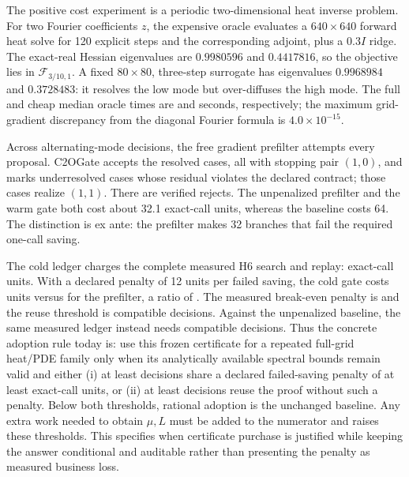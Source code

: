 \documentclass[smallextended]{svjour3}
\newcommand{\cF}{\mathcal{F}}
\begin{document}
The positive cost experiment is a periodic two-dimensional heat inverse
problem.  For two Fourier coefficients $z$, the expensive oracle evaluates a
$640\times640$ forward heat solve for 120 explicit steps and the corresponding
adjoint, plus a $0.3I$ ridge.  The exact-real Hessian eigenvalues are
$0.9980596$ and $0.4417816$, so the objective lies in
$\cF_{3/10,1}$.  A fixed $80\times80$, three-step surrogate has eigenvalues
$0.9968984$ and $0.3728483$: it resolves the low mode but over-diffuses the
high mode.  The full and cheap median oracle times are
\HeatExactMedianSeconds{} and \HeatCheapMedianSeconds{} seconds, respectively;
the maximum grid-gradient discrepancy from the diagonal Fourier formula is
$4.0\times10^{-15}$.

Across \HeatEpisodes{} alternating-mode decisions, the free gradient prefilter
attempts every proposal.  C2OGate accepts the \HeatAccepted{} resolved cases,
all with stopping pair $(1,0)$, and marks \HeatUncertified{} underresolved
cases whose residual violates the declared contract; those cases realize
$(1,1)$.  There are \HeatRejected{} verified rejects.  The unpenalized
prefilter and the warm gate both cost about 32.1
exact-call units, whereas the baseline costs 64.  The distinction is ex ante:
the prefilter makes 32 branches that fail the required one-call saving.

The cold ledger charges the complete measured H6 search and replay:
\HeatCertificateUnits{} exact-call units.  With a declared penalty of 12 units
per failed saving, the cold gate costs \HeatColdGateUnits{} units versus
\HeatRiskPrefilterUnits{} for the prefilter, a ratio of
\HeatGateRiskRatio{}.  The measured break-even penalty is
\HeatBreakEvenPenalty{} and the reuse threshold is
\HeatAmortizationEpisodes{} compatible decisions.  Against the unpenalized
baseline, the same measured ledger instead needs
\HeatUnpenalizedAmortizationEpisodes{} compatible decisions.  Thus the concrete
adoption rule today is: use this frozen certificate for a repeated full-grid
heat/PDE family only when its analytically available spectral bounds remain
valid and either (i) at least \HeatAmortizationEpisodes{} decisions share a
declared failed-saving penalty of at least \HeatBreakEvenPenalty{} exact-call
units, or (ii) at least \HeatUnpenalizedAmortizationEpisodes{} decisions reuse
the proof without such a penalty.  Below both thresholds, rational adoption is
the unchanged baseline.  Any extra work needed to obtain $\mu,L$ must be added
to the numerator and raises these thresholds.  This specifies when certificate
purchase is justified while keeping the answer conditional and auditable rather than presenting the
penalty as measured business loss.
\end{document}
